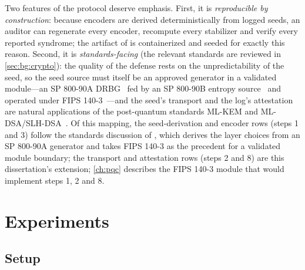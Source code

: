 Two features of the protocol deserve emphasis. First, it is \emph{reproducible by construction}: because encoders are derived deterministically from logged seeds, an auditor can regenerate every encoder, recompute every stabilizer and verify every reported syndrome; the artifact of \cite{guo2026qecaudit} is containerized and seeded for exactly this reason. Second, it is \emph{standards-facing} (the relevant standards are reviewed in \cref{sec:bg:crypto}): the quality of the defense rests on the unpredictability of the seed, so the seed source must itself be an approved generator in a validated module---an SP 800-90A DRBG~\cite{nist2015sp80090a} fed by an SP 800-90B entropy source~\cite{nist2018sp80090b} and operated under FIPS 140-3~\cite{nist2019fips1403}---and the seed's transport and the log's attestation are natural applications of the post-quantum standards ML-KEM and ML-DSA/SLH-DSA~\cite{nist2024fips203,nist2024fips204,nist2024fips205}. Of this mapping, the seed-derivation and encoder rows (steps 1 and 3) follow the standards discussion of \cite{guo2026qecaudit}, which derives the layer choices from an SP 800-90A generator and takes FIPS 140-3 as the precedent for a validated module boundary; the transport and attestation rows (steps 2 and 8) are this dissertation's extension; \cref{ch:pqc} describes the FIPS 140-3 module that would implement steps 1, 2 and 8.

\section{Experiments}\label{sec:qec:experiments}

\subsection{Setup}\label{sec:qec:setup}

